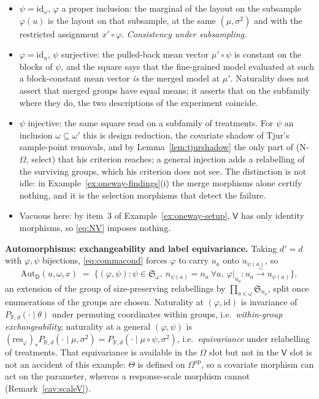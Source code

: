 \documentclass[11pt,a4paper]{article}
\theoremstyle{plain}
\theoremstyle{definition}
\theoremstyle{remark}
\newcommand{\cat}[1]{\mathsf{#1}}
\newcommand{\catU}{\cat{U}}
\newcommand{\catV}{\cat{V}}
\newcommand{\catO}{\cat{\Omega}}
\newcommand{\catD}{\cat{D}}
\newcommand{\op}{\mathrm{op}}
\newcommand{\id}{\mathrm{id}}
\newcommand{\R}{\mathbb{R}}
\newcommand{\res}{\mathrm{res}}
\begin{document}
\begin{itemize}
\item[(N-$\catU$)] $\psi = \id_{\omega}$, $\varphi$ a proper inclusion:
the marginal of the layout on the subsample $\varphi(u)$ is the layout on that
subsample, at the same $(\mu,\sigma^{2})$ and with the restricted assignment
$x' \circ \varphi$. \emph{Consistency under subsampling.}

\item[(N-$\catO$, merge)] $\varphi = \id_{u}$, $\psi$ surjective: the
pulled-back mean vector $\mu' \circ \psi$ is constant on the blocks of $\psi$,
and the square says that the fine-grained model evaluated at such a
block-constant mean vector \emph{is} the merged model at $\mu'$. Naturality
does not assert that merged groups have equal means; it asserts that on the
subfamily where they do, the two descriptions of the experiment coincide.

\item[(N-$\catO$, select)] $\psi$ injective: the same square read on a
subfamily of treatments. For $\psi$ an inclusion $\omega \subseteq \omega'$
this is design reduction, the covariate shadow of Tjur's sample-point
removals, and by Lemma~\ref{lem:tjurshadow} the only part of (N-$\catO$, select)
that his criterion reaches; a general injection adds a relabelling of the
surviving groups, which his criterion does not see. The distinction is not
idle: in Example~\ref{ex:oneway-findings}(i) the merge morphisms alone
certify nothing, and it is the selection morphisms that detect the failure.

\item[(N-$\catV$)] Vacuous here: by item~3 of
Example~\ref{ex:oneway-setup}, $\catV$ has only identity morphisms, so
\eqref{eq:NV} imposes nothing.
\end{itemize}

\noindent\textbf{Automorphisms: exchangeability and label equivariance.}
Taking $d' = d$ with $\varphi,\psi$ bijections, \eqref{eq:commacond} forces
$\varphi$ to carry $u_a$ onto $u_{\psi(a)}$, so
\[
\mathrm{Aut}_{\catD}(u,\omega,x)
\;=\;
\bigl\{(\varphi,\psi) : \psi \in \mathfrak{S}_{\omega},\ n_{\psi(a)} = n_a\ \forall a,\
\varphi|_{u_a} \colon u_a \xrightarrow{\ \sim\ } u_{\psi(a)}\bigr\},
\]
an extension of the group of size-preserving relabellings by
$\prod_{a \in \omega} \mathfrak{S}_{n_a}$, split once enumerations of the
groups are chosen. Naturality at $(\varphi,\id)$ is invariance of
$P_{\R,d}(\cdot \mid \theta)$ under permuting coordinates within groups, i.e.\
\emph{within-group exchangeability}; naturality at a general $(\varphi,\psi)$
is $(\res_{\varphi})_{*}P_{\R,d}(\cdot \mid \mu,\sigma^{2}) = P_{\R,d}(\cdot
\mid \mu \circ \psi,\sigma^{2})$, i.e.\ \emph{equivariance} under relabelling
of treatments. That equivariance is available in the $\catO$ slot but not
in the $\catV$ slot is not an accident of this example: $\Theta$ is defined on
$\catO^{\op}$, so a covariate morphism can act on the parameter, whereas a
response-scale morphism cannot (Remark~\ref{cav:scaleV}).
\end{document}
